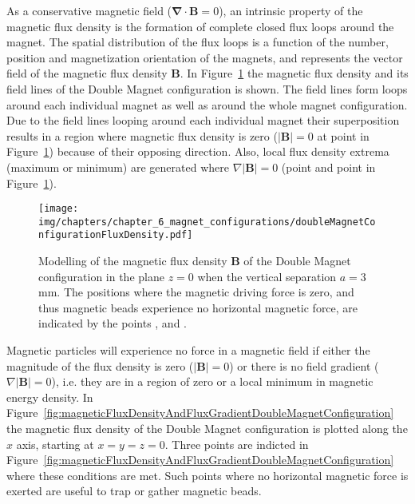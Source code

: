 As a conservative magnetic field ($\mathbf{\nabla} \cdot \mathbf{B} = 0$), an intrinsic property of the magnetic flux density is the formation of complete closed flux loops around the magnet. The spatial distribution of the flux loops is a function of the number, position and magnetization orientation of the magnets, and represents the vector field of the magnetic flux density $\mathbf{B}$. In Figure~\ref{fig:magneticFluxDensityDoubleMagnetConfiguration} the magnetic flux density and its field lines of the Double Magnet configuration is shown. The field lines form loops around each individual magnet as well as around the whole magnet configuration. Due to the field lines looping around each individual magnet their superposition results in a region where magnetic flux density is zero ($|\mathbf{B}|=0$ at point  in Figure~\ref{fig:magneticFluxDensityDoubleMagnetConfiguration}) because of their opposing direction. Also, local flux density extrema (maximum or minimum) are generated where $\nabla|\mathbf{B}|=0$ (point  and point  in Figure~\ref{fig:magneticFluxDensityDoubleMagnetConfiguration}).
\begin{figure}[htb]
   \centering
   \texttt{[image: img/chapters/chapter\_6\_magnet\_configurations/doubleMagnetConfigurationFluxDensity.pdf]}
   \caption[Simulated vector field and flux density of the Double Magnet configuration]{Modelling of the magnetic flux density $\mathbf{B}$ of the Double Magnet configuration in the plane $z=0$ when the vertical separation $a=3$ mm. The positions where the magnetic driving force is zero, and thus magnetic beads experience no horizontal magnetic force, are indicated by the points ,  and .}
   \label{fig:magneticFluxDensityDoubleMagnetConfiguration}
\end{figure}
Magnetic particles will experience no force in a magnetic field if either the magnitude of the flux density is zero ($|\mathbf{B}|=0$) or there is no field gradient ($\nabla|\mathbf{B}|=0$), i.e. they are in a region of zero or a local minimum in magnetic energy density. In Figure~\ref{fig:magneticFluxDensityAndFluxGradientDoubleMagnetConfiguration} the magnetic flux density of the Double Magnet configuration is plotted along the $x$ axis, starting at $x=y=z=0$. Three points are indicted in Figure~\ref{fig:magneticFluxDensityAndFluxGradientDoubleMagnetConfiguration} where these conditions are met. Such points where no horizontal magnetic force is exerted are useful to trap or gather magnetic beads.
